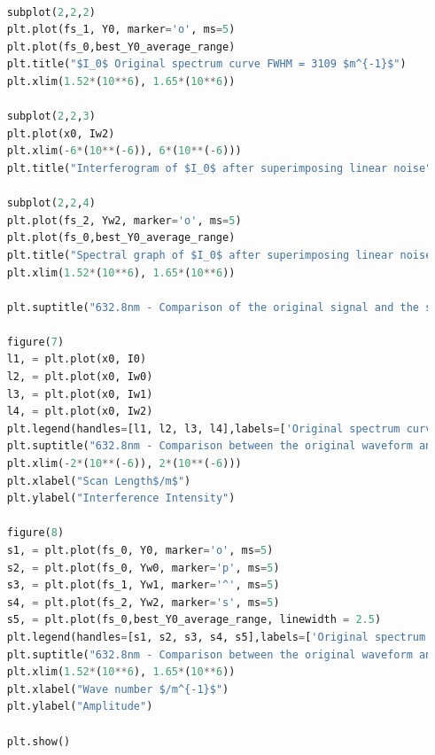 \documentclass[conference]{IEEEtran}
\begin{document}
\begin{lstlisting}[language=python]
    
    subplot(2,2,2)
    plt.plot(fs_1, Y0, marker='o', ms=5)
    plt.plot(fs_0,best_Y0_average_range)
    plt.title("$I_0$ Original spectrum curve FWHM = 3109 $m^{-1}$")
    plt.xlim(1.52*(10**6), 1.65*(10**6))
    
    subplot(2,2,3)
    plt.plot(x0, Iw2)
    plt.xlim(-6*(10**(-6)), 6*(10**(-6)))
    plt.title("Interferogram of $I_0$ after superimposing linear noise")
    
    subplot(2,2,4)
    plt.plot(fs_2, Yw2, marker='o', ms=5)
    plt.plot(fs_0,best_Y0_average_range)
    plt.title("Spectral graph of $I_0$ after superimposing linear noise FWHM = 3300 $m^{-1}$")
    plt.xlim(1.52*(10**6), 1.65*(10**6))
    
    plt.suptitle("632.8nm - Comparison of the original signal and the signal after adding linear noise", fontsize = 20)
    
    figure(7)
    l1, = plt.plot(x0, I0)
    l2, = plt.plot(x0, Iw0)
    l3, = plt.plot(x0, Iw1)
    l4, = plt.plot(x0, Iw2)
    plt.legend(handles=[l1, l2, l3, l4],labels=['Original spectrum curve', 'Sine noise', 'Random noise', 'Linear noise'], loc='upper right')
    plt.suptitle("632.8nm - Comparison between the original waveform and \n the waveform after adding three kinds of noise", fontsize = 20)
    plt.xlim(-2*(10**(-6)), 2*(10**(-6)))
    plt.xlabel("Scan Length$/m$")
    plt.ylabel("Interference Intensity")
    
    figure(8)
    s1, = plt.plot(fs_0, Y0, marker='o', ms=5)
    s2, = plt.plot(fs_0, Yw0, marker='p', ms=5)
    s3, = plt.plot(fs_1, Yw1, marker='^', ms=5)
    s4, = plt.plot(fs_2, Yw2, marker='s', ms=5)
    s5, = plt.plot(fs_0,best_Y0_average_range, linewidth = 2.5)
    plt.legend(handles=[s1, s2, s3, s4, s5],labels=['Original spectrum curve', 'Sine noise', 'Random noise', 'Linear noise', 'FWHM'], loc='upper right')
    plt.suptitle("632.8nm - Comparison between the original waveform and the spectrum measurement curve \n after adding three kinds of noise", fontsize = 20)
    plt.xlim(1.52*(10**6), 1.65*(10**6))
    plt.xlabel("Wave number $/m^{-1}$")
    plt.ylabel("Amplitude")
    
    plt.show()
    
\end{lstlisting}
\end{document}
